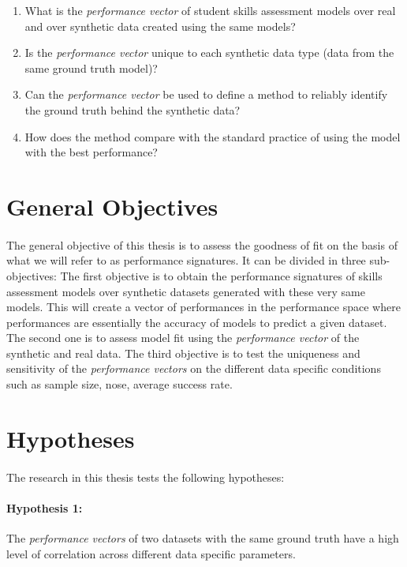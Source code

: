 \begin{enumerate}
\item What is the \textit{performance vector} of student skills assessment models over real and over synthetic data created using the same models?
\item Is the \textit{performance vector} unique to each synthetic data type (data from the same ground truth model)?
\item Can the \textit{performance vector} be used to define a method to reliably identify the ground truth behind the synthetic data?
\item How does the method compare with the standard practice of using the model with the best performance? %
\end{enumerate}


\section{General Objectives}

\paragraph{}The general objective of this thesis is to assess the goodness of fit on the basis of what we will refer to as performance signatures. It can be divided in three sub-objectives: The first objective is to obtain the performance signatures of skills assessment models over synthetic datasets generated with these very same models. This will create a vector of performances in the performance space where performances are essentially the accuracy of models to predict a given dataset. The second one is to assess model fit using the \textit{performance vector} of the synthetic and real data. The third objective is to test the uniqueness and sensitivity of the \textit{performance vectors} on the different data specific conditions such as sample size, nose, average success rate.

\section{Hypotheses}
\paragraph{}The research in this thesis tests the following hypotheses:
\paragraph{Hypothesis 1:} The \textit{performance vectors} of two datasets with the same ground truth have a high level of correlation across different data specific parameters. 

